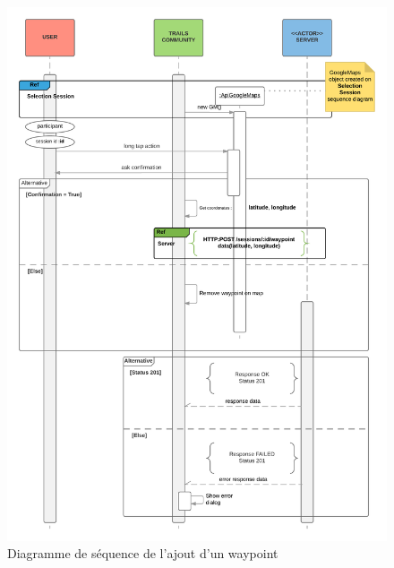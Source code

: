 \documentclass[titlepage, 12pt]{report}
\begin{document}
\begin{figure}[!h]
	\caption{Diagramme de séquence de l'ajout d'un waypoint}
	\label{add_waypoint_sequence_diagram}
	\centering
	\includegraphics[scale=0.2]{Images/diagram/add_waypoint_sequence_diagram.png}
\end{figure}
\end{document}
